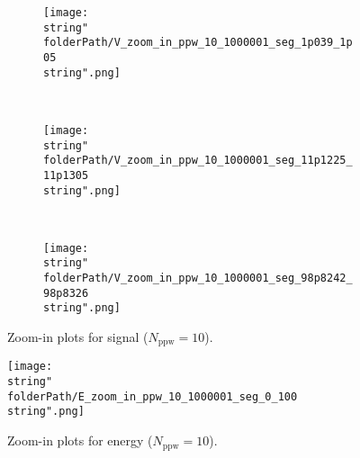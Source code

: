 

\renewcommand{\folderPath}{\string"./fig/1D_example/validate/dt_dx/comparison/plot_dt_h_10_9p997558593749999e-05_dt_h_30_9p997558593749999e-05_dt_h_50_9p997558593749999e-05/half_compensated_chop_D_3_chop_dt_dx_3_single_double/\string"}



\begin{figure}[H]
\captionsetup{width=0.95\textwidth,font=footnotesize,labelfont=footnotesize}
\centering
%
\begin{subfigure}[b]{1\textwidth}
%
\centering\texttt{[image: \\string"\\folderPath/V\_zoom\_in\_ppw\_10\_1000001\_seg\_1p039\_1p05\\string".png]}
%
\end{subfigure}\hfill
\\[2ex]
%
\begin{subfigure}[b]{1\textwidth}
%
\centering\texttt{[image: \\string"\\folderPath/V\_zoom\_in\_ppw\_10\_1000001\_seg\_11p1225\_11p1305\\string".png]}
%
\end{subfigure}\hfill
\\[2ex]
%
\begin{subfigure}[b]{1\textwidth}
%
\centering\texttt{[image: \\string"\\folderPath/V\_zoom\_in\_ppw\_10\_1000001\_seg\_98p8242\_98p8326\\string".png]}
%
\end{subfigure}\hfill
%
\caption{Zoom-in plots for signal ($N_\text{ppw}=10$).}
\label{comparison_V_half_compensated_zoom_in_ppw_10}
\end{figure}


\begin{figure}[H]
\captionsetup{width=1\textwidth, font=footnotesize,labelfont=footnotesize}
\centering
%
\centering\texttt{[image: \\string"\\folderPath/E\_zoom\_in\_ppw\_10\_1000001\_seg\_0\_100\\string".png]}
%
\caption{Zoom-in plots for energy ($N_\text{ppw}=10$).}
\label{comparison_E_half_compensated_zoom_in_ppw_10}
\end{figure}


\renewcommand{\folderPath}{\string"/dev/null\string"}